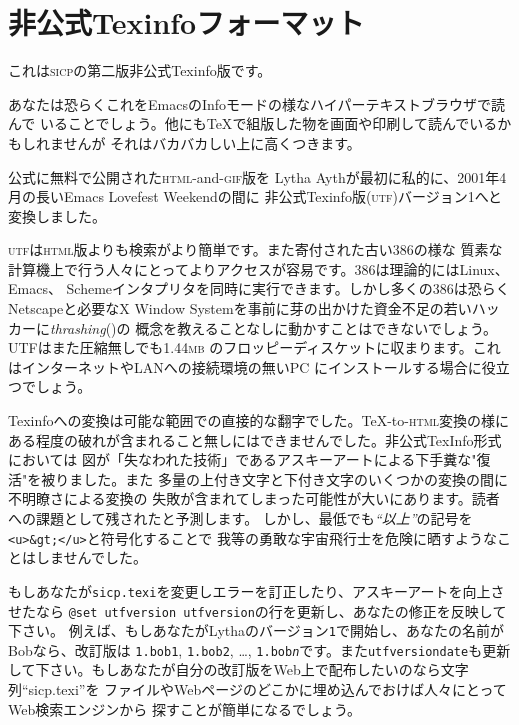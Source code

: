 \documentclass[oneside]{book}
\newcommand{\acronym}[1]{\textsc{\MakeLowercase{#1}}}
\newcommand{\newterm}[1]{\index{#1}\emph{#1}}
\newcommand{\jnewterm}[1]{\index{#1}{\bf #1}}
\newcommand{\code}[1]{\texttt{#1}}
\begin{document}
\pagebreak

\tableofcontents

\small  %


\chapter*{非公式Texinfoフォーマット}
\label{UTF}

これは\acronym{SICP}の第二版非公式Texinfo版です。

あなたは恐らくこれをEmacsのInfoモードの様なハイパーテキストブラウザで読んで
いることでしょう。他にも{\TeX}で組版した物を画面や印刷して読んでいるかもしれませんが
それはバカバカしい上に高くつきます。


公式に無料で公開された\acronym{HTML}-and-\acronym{GIF}版を
Lytha Aythが最初に私的に、2001年4月の長いEmacs Lovefest Weekendの間に
非公式Texinfo版(\acronym{UTF})バージョン1へと変換しました。



\acronym{UTF}は\acronym{HTML}版よりも検索がより簡単です。また寄付された古い386の様な
質素な計算機上で行う人々にとってよりアクセスが容易です。386は理論的にはLinux、Emacs、
Schemeインタプリタを同時に実行できます。しかし多くの386は恐らくNetscapeと必要なX Window
Systemを事前に芽の出かけた資金不足の若いハッカーに\newterm{thrashing}(\jnewterm{スラッシング})の
概念を教えることなしに動かすことはできないでしょう。UTFはまた圧縮無しでも1.44\acronym{MB}
のフロッピーディスケットに収まります。これはインターネットやLANへの接続環境の無いPC
にインストールする場合に役立つでしょう。



Texinfoへの変換は可能な範囲での直接的な翻字でした。{\TeX}-to-\acronym{HTML}変換の様に
ある程度の破れが含まれること無しにはできませんでした。非公式TexInfo形式においては
図が「失なわれた技術」であるアスキーアートによる下手糞な"復活"を被りました。また
多量の上付き文字と下付き文字のいくつかの変換の間に不明瞭さによる変換の
失敗が含まれてしまった可能性が大いにあります。読者への課題として残されたと予測します。
しかし、最低でも\emph{``以上''}の記号を\texttt{<u>\&gt;</u>}と符号化することで
我等の勇敢な宇宙飛行士を危険に晒すようなことはしませんでした。



もしあなたが\texttt{sicp.texi}を変更しエラーを訂正したり、アスキーアートを向上させたなら
\code{@set utfversion {utfversion}}の行を更新し、あなたの修正を反映して下さい。
例えば、もしあなたがLythaのバージョン\code{1}で開始し、あなたの名前がBobなら、改訂版は
\code{1.bob1}, \code{1.bob2}, \dots , \code{1.bob\textit{n}}です。また\code{utfversiondate}も更新
して下さい。もしあなたが自分の改訂版をWeb上で配布したいのなら文字列``sicp.texi''を
ファイルやWebページのどこかに埋め込んでおけば人々にとってWeb検索エンジンから
探すことが簡単になるでしょう。
\end{document}
